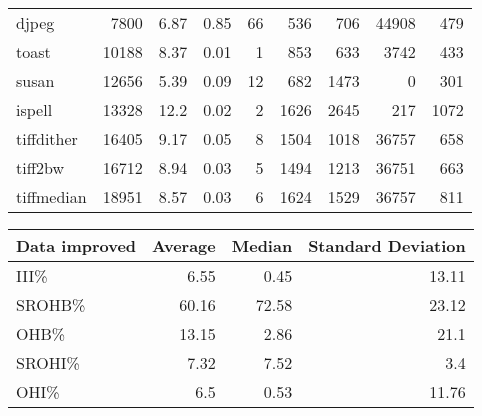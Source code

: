 \begin{tabular}{lrrrrrrrr}
 djpeg           &           7800 &     6.87 &   0.85 &   66 &    536 &          706 & 44908 &   479 \\
 toast           &          10188 &     8.37 &   0.01 &    1 &    853 &          633 &  3742 &   433 \\
 susan           &          12656 &     5.39 &   0.09 &   12 &    682 &         1473 &     0 &   301 \\
 ispell          &          13328 &    12.2  &   0.02 &    2 &   1626 &         2645 &   217 &  1072 \\
 tiffdither      &          16405 &     9.17 &   0.05 &    8 &   1504 &         1018 & 36757 &   658 \\
 tiff2bw         &          16712 &     8.94 &   0.03 &    5 &   1494 &         1213 & 36751 &   663 \\
 tiffmedian      &          18951 &     8.57 &   0.03 &    6 &   1624 &         1529 & 36757 &   811 \\
\hline
\end{tabular}\begin{tabular}{lrrr}
\hline
 Data improved   &   Average &   Median &   Standard Deviation \\
\hline
 III\%            &      6.55 &     0.45 &                13.11 \\
 SROHB\%          &     60.16 &    72.58 &                23.12 \\
 OHB\%            &     13.15 &     2.86 &                21.1  \\
 SROHI\%          &      7.32 &     7.52 &                 3.4  \\
 OHI\%            &      6.5  &     0.53 &                11.76 \\
\hline
\end{tabular}